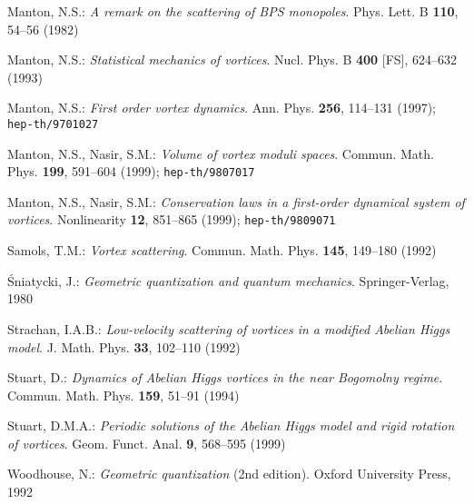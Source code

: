 \documentclass[a4paper,11pt]{article}
\begin{document}
\begin{thebibliography}{99}
\begin{small}
{\sc Manton, N.S.}: {\it A remark on the scattering of BPS monopoles}. 
Phys. Lett. B {\bf 110}, 54--56 (1982)

{\sc Manton, N.S.}: {\it Statistical mechanics of vortices}. 
Nucl. Phys. B {\bf 400} [FS], 624--632 (1993)

{\sc Manton, N.S.}: {\it First order vortex dynamics}. Ann. Phys. {\bf
256}, 114--131 (1997); {\tt hep-th/9701027}

{\sc Manton, N.S.}, {\sc Nasir, S.M.}: {\it Volume of vortex moduli
spaces}. Commun. Math. Phys. {\bf 199}, 591--604 (1999); {\tt hep-th/9807017}

{\sc Manton, N.S.}, {\sc Nasir, S.M.}: {\it Conservation laws in a
first-order dynamical system of vortices}. Nonlinearity {\bf 12},
851--865 (1999); {\tt hep-th/9809071}

{\sc Samols, T.M.}: {\it Vortex scattering}. Commun. Math. Phys. {\bf
145}, 149--180 (1992)

{\sc \'Sniatycki, J.}: {\it Geometric quantization and quantum mechanics}. 
Springer-Verlag, 1980

{\sc Strachan, I.A.B.}: {\it Low-velocity scattering of vortices in a
modified Abelian Higgs model}. J. Math. Phys. {\bf 33}, 102--110 (1992)

{\sc Stuart, D.}: {\it Dynamics of Abelian Higgs vortices in the
near Bogomolny regime}. Commun. Math. Phys. {\bf
159}, 51--91 (1994)

{\sc Stuart, D.M.A.}: {\it Periodic solutions of the Abelian Higgs model
and rigid rotation of vortices}. Geom. Funct. Anal. {\bf 9}, 568--595 (1999)

{\sc Woodhouse, N.}: {\it Geometric quantization} (2nd edition). 
Oxford University Press, 1992

\end{small}

\end{thebibliography}
\end{document}
